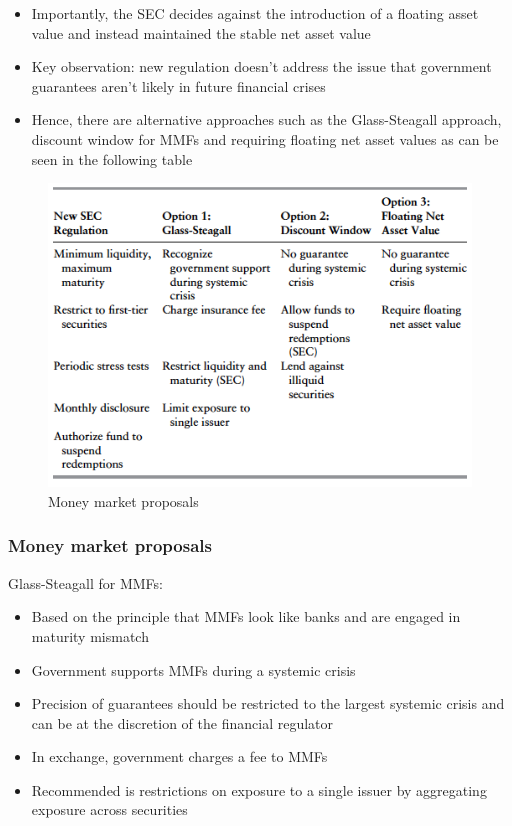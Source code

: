 \documentclass[11pt]{beamer}
\begin{document}
\begin{frame}
\begin{itemize}
\item Importantly, the SEC decides against the introduction of a floating asset value and instead maintained the stable net asset value
\item Key observation: new regulation doesn't address the issue that government guarantees aren't likely in future financial crises
\item Hence, there are alternative approaches such as the Glass-Steagall approach, discount window for MMFs and requiring floating net asset values as can be seen in the following table
\end{itemize}
\end{frame}

\begin{frame}
\begin{figure}
\includegraphics[width=\textwidth]{10_6.png}
\caption{Money market proposals}
\end{figure}
\end{frame}

\begin{frame}
\frametitle{Money market proposals}
Glass-Steagall for MMFs:
\begin{itemize}
\item Based on the principle that MMFs look like banks and are engaged in maturity mismatch
\item Government supports MMFs during a systemic crisis
\item Precision of guarantees should be restricted to the largest systemic crisis and can be at the discretion of the financial regulator
\item In exchange, government charges a fee to MMFs
\item Recommended is restrictions on exposure to a single issuer by aggregating exposure across securities
\end{itemize}
\end{frame}
\end{document}
